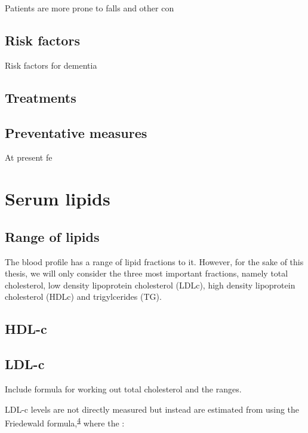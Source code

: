 \documentclass[a4paper, twoside]{templates/ociamthesis}
\begin{document}
Patients are more prone to falls and other con

\hypertarget{risk-factors}{%
\subsection{Risk factors}\label{risk-factors}}

Risk factors for dementia

\hypertarget{treatments}{%
\subsection{Treatments}\label{treatments}}

\hypertarget{preventative-measures}{%
\subsection{Preventative measures}\label{preventative-measures}}

At present fe

\hypertarget{serum-lipids}{%
\section{Serum lipids}\label{serum-lipids}}

\hypertarget{range-of-lipids}{%
\subsection{Range of lipids}\label{range-of-lipids}}

The blood profile has a range of lipid fractions to it. However, for the sake of this thesis, we will only consider the three most important fractions, namely total cholesterol, low density lipoprotein cholesterol (LDLc), high density lipoprotein cholesterol (HDLc) and trigylcerides (TG).

\hypertarget{hdl-c}{%
\subsection{HDL-c}\label{hdl-c}}

\hypertarget{ldl-c}{%
\subsection{LDL-c}\label{ldl-c}}

Include formula for working out total cholesterol and the ranges.

LDL-c levels are not directly measured but instead are estimated from using the Friedewald formula,\textsuperscript{\protect\hyperlink{ref-friedewald1972}{4}} where the :
\end{document}
